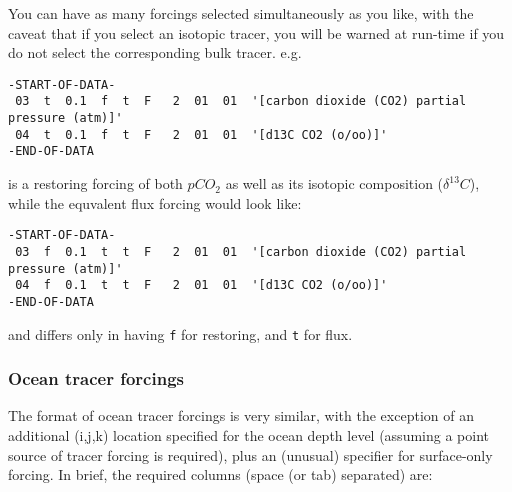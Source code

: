 \vspace{1mm}
You can have as many forcings selected simultaneously as you like, with the caveat that if you select an isotopic tracer, you will be warned at run-time if you do not select the corresponding bulk tracer. e.g.

\vspace{-2mm}\footnotesize\begin{verbatim}
-START-OF-DATA-
 03  t  0.1  f  t  F   2  01  01  '[carbon dioxide (CO2) partial pressure (atm)]'
 04  t  0.1  f  t  F   2  01  01  '[d13C CO2 (o/oo)]'
-END-OF-DATA
\end{verbatim}\normalsize\vspace{-2mm}

\noindent is a restoring forcing of both \(pCO_{2}\) as well as its isotopic composition (\(\delta ^{13}C\)), while the equvalent flux forcing would look like:

\vspace{-2mm}\footnotesize\begin{verbatim}
-START-OF-DATA-
 03  f  0.1  t  t  F   2  01  01  '[carbon dioxide (CO2) partial pressure (atm)]'
 04  f  0.1  t  t  F   2  01  01  '[d13C CO2 (o/oo)]'
-END-OF-DATA
\end{verbatim}\normalsize\vspace{-2mm}

\noindent and differs only in having \texttt{f} for restoring, and \texttt{t} for flux.

\newpage
%
\subsubsection*{Ocean tracer forcings}

\vspace{1mm}

The format of ocean tracer forcings is very similar, with the exception of an additional (i,j,k) location specified for the ocean depth level (assuming a point source of tracer forcing is required), plus an (unusual) specifier for surface-only forcing. In brief, the required columns (space (or tab) separated) are:

